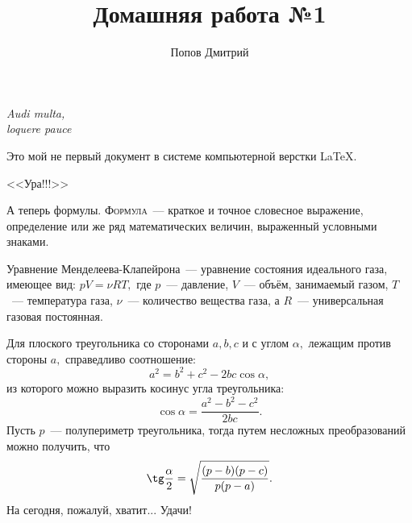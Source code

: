 \documentclass[12pt]{article}
\title{Домашняя работа №1}
\author{Попов Дмитрий}
\date{}
\begin{document}
	\maketitle
    \begin{flushright}
        \itshape{Audi multa,}\\
        \itshape{loquere pauce}
    \end{flushright}
    \vspace{20pt}
    
    Это мой не первый документ в системе компьютерной верстки \LaTeX.
    
    \begin{center}
        \textsf{\huge{<<Ура!!!>>}}
    \end{center}

    А теперь формулы. \textsc{Формула}~--- краткое и точное словесное выражение, определение или же ряд математических величин, выраженный условными знаками.\\[15pt]
    \hspace*{28pt}{\bfseries\Large Термодинамика}
    
    Уравнение Менделеева-Клапейрона~--- уравнение состояния идеального газа, имеющее вид: $pV=\nu RT,$ где $p$~--- давление, $V$~--- объём, занимаемый газом, $T$~--- температура газа, $\nu$~--- количество вещества газа, а $R$~--- универсальная газовая постоянная.\\[15pt]
    \hspace*{28pt}{\bfseries\Large Геометрия \hfill Планиметрия}

    Для плоского треугольника со сторонами $a, b, c$ и с углом $\alpha,$ лежащим против стороны $a,$ справедливо соотношение:
    $$a^2=b^2+c^2-2bc\cos\alpha,$$
    из которого можно выразить косинус угла треугольника:
    $$\cos\alpha=\frac{a^2-b^2-c^2}{2bc}.$$
    \newpage %
    Пусть $p$~--- полупериметр треугольника, тогда путем несложных преобразований можно получить, что
    $$\tg\frac\alpha2=\sqrt{\frac{(p-b)(p-c)}{p(p-a)}}.$$
    \vspace{1cm}
    На сегодня, пожалуй, хватит... Удачи!
\end{document}
